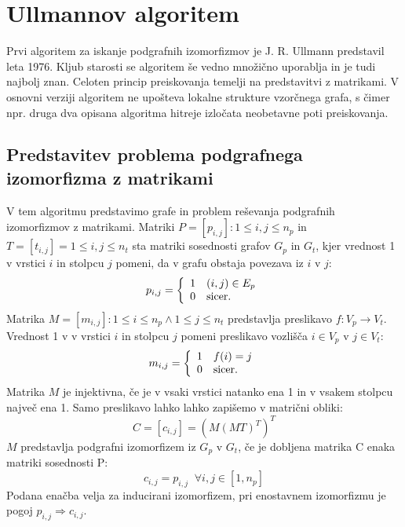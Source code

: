 \documentclass[a4paper, 12pt, ]{book}
\newcommand{\TODO}[1]{\textcolor{red}{#1}}
\begin{document}
\chapter{Ullmannov algoritem}
	
	Prvi algoritem za iskanje podgrafnih izomorfizmov je J. R. Ullmann predstavil leta 1976. Kljub starosti se algoritem še vedno množično uporablja
	in je tudi najbolj znan. Celoten princip preiskovanja temelji na predstavitvi z matrikami. V osnovni verziji algoritem ne upošteva lokalne strukture
	vzorčnega grafa, s čimer npr. druga dva opisana algoritma hitreje izločata neobetavne poti preiskovanja.
	
	\section{Predstavitev problema podgrafnega izomorfizma z matrikami}
	V tem algoritmu predstavimo grafe in problem reševanja podgrafnih izomorfizmov z matrikami. Matriki $P = [p_{i,j}] : 1 \le i,j \le n_p $ in
	$T = [t_{i,j}] = 1 \le i,j \le n_t$ sta matriki sosednosti grafov $G_p$ in $G_t$, kjer vrednost 1 v vrstici $i$ in stolpcu $j$ pomeni, 
	da v grafu obstaja povezava
	iz $i$ v $j$:
		\begin{equation}
		 	p_{i,j} = \left\{
			\begin{array}{l l}
			    1 & (i,j) \in E_p\\
			    0 & \text{sicer.}
			\end{array} \right.
		\end{equation}
	Matrika $M = [m_{i,j}]: 1 \le i \le n_p \wedge 1 \le j \le n_t$ predstavlja preslikavo $f: V_p \to V_t$. Vrednost 1 v v vrstici $i$ in stolpcu $j$ 
	pomeni preslikavo vozlišča
	$i \in V_p$ v $j \in V_t$:
		\begin{equation}
			m_{i,j} = \left\{
			\begin{array}{l l}
			    1 & f(i) = j\\
			    0 & \text{sicer.}
			\end{array} \right.
		\end{equation}
	Matrika $M$ je injektivna, če je v vsaki vrstici natanko ena 1 in v vsakem stolpcu največ ena 1. Samo preslikavo lahko lahko zapišemo v matrični obliki:
		\begin{equation}
			C = [c_{i,j}] = (M(MT)^T)^T
		\end{equation}
	$M$ predstavlja podgrafni izomorfizem iz $G_p$ v $G_t$, če je dobljena matrika C enaka matriki sosednosti P:
		\begin{equation}
			\label{eq:ullmann1}
			c_{i,j} = p_{i,j}\;\; \forall i,j \in [1, n_p]
		\end{equation}	 
	Podana enačba velja za inducirani izomorfizem, pri enostavnem izomorfizmu je pogoj $p_{i,j} \Rightarrow c_{i, j}$.
	
\end{document}
